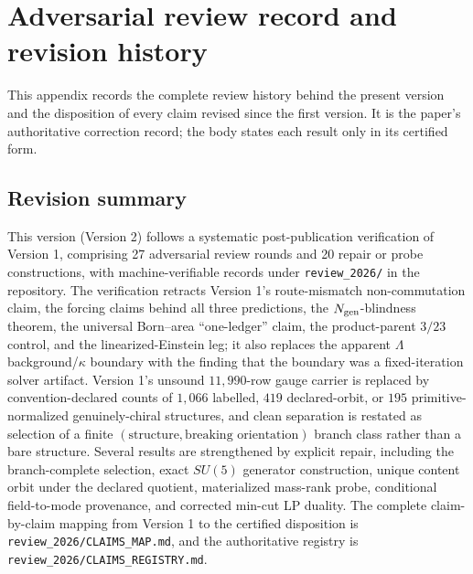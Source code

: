 \hypertarget{adversarial-review-record}{%
\section{Adversarial review record and revision history}\label{adversarial-review-record}}

This appendix records the complete review history behind the present version and the disposition of every claim revised
since the first version. It is the paper's authoritative correction record; the body states each result only in its
certified form.

\subsection{Revision summary}

This version (Version 2) follows a systematic post-publication verification of Version 1, comprising 27
adversarial review rounds and 20 repair or probe constructions, with machine-verifiable records under
\nolinkurl{review_2026/} in the repository. The verification retracts Version 1's route-mismatch non-commutation claim, the
forcing claims behind all three predictions, the \(N_{\rm gen}\)-blindness theorem, the universal Born--area
``one-ledger'' claim, the product-parent \(3/23\) control, and the linearized-Einstein leg; it also replaces the apparent
\(\Lambda\) background/\(\kappa\) boundary with the finding that the boundary was a fixed-iteration solver artifact.
Version 1's unsound \(11{,}990\)-row gauge carrier is replaced by convention-declared counts of \(1{,}066\) labelled,
\(419\) declared-orbit, or \(195\) primitive-normalized genuinely-chiral structures, and clean separation is restated
as selection of a finite \((\text{structure},\text{breaking orientation})\) branch class rather than a bare structure.
Several results are strengthened by explicit repair, including the branch-complete selection, exact \(SU(5)\) generator
construction, unique content orbit under the declared quotient, materialized mass-rank probe, conditional field-to-mode
provenance, and corrected min-cut LP duality. The complete claim-by-claim mapping from Version 1 to the certified
disposition is \nolinkurl{review_2026/CLAIMS_MAP.md}, and the authoritative registry is
\nolinkurl{review_2026/CLAIMS_REGISTRY.md}.

